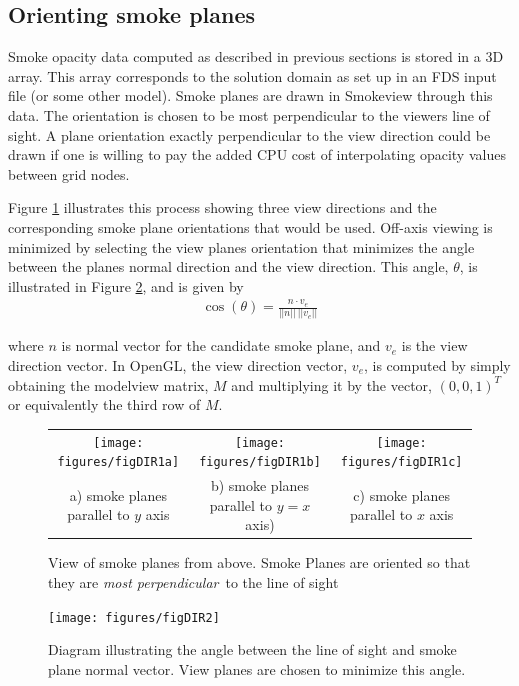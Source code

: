%
%

\subsection{Orienting smoke planes}

Smoke opacity data computed as described in previous sections is
stored in a 3D array. This array corresponds to the solution
domain as set up in an FDS input file (or some other model). Smoke
planes are drawn in Smokeview through this data.  The orientation
is chosen to be most perpendicular to the viewers line of sight. A
plane orientation exactly perpendicular to the view direction
could be drawn if one is willing to pay the added CPU cost of
interpolating opacity values between grid nodes.

Figure \ref{figDIRA} illustrates this process showing three view
directions and the corresponding smoke plane orientations that
would be used. Off-axis viewing is minimized by selecting the view
planes orientation that minimizes the angle between the planes
normal direction and the view direction. This angle, $\theta$, is
illustrated in Figure \ref{figDIRB}, and is given by
\begin{eqnarray*}
\cos(\theta)=\frac{n\cdot v_e}{||n||~||v_e||}
\end{eqnarray*}

\noindent where $n$ is normal vector for the candidate smoke
plane, and $v_e$ is the view direction vector.  In OpenGL, the
view direction vector, $v_e$, is computed by simply obtaining the
modelview matrix, $M$ and multiplying it by the vector,
$(0,0,1)^T$ or equivalently the third row of $M$.

\begin{figure}
\begin{tabular}{ccc}
\texttt{[image: figures/figDIR1a]}&
\texttt{[image: figures/figDIR1b]}&
\texttt{[image: figures/figDIR1c]}\\
a) smoke planes parallel to $y$ axis& b) smoke planes parallel to
$y=x$ axis)&
c) smoke planes parallel to $x$ axis\\
\end{tabular}
\caption{View of smoke planes from above.  Smoke Planes are
oriented so that they are {\em most perpendicular}\ to the line of sight }
\label{figDIRA}
\end{figure}

\begin{figure}
\centerline{\texttt{[image: figures/figDIR2]}}
\caption{Diagram illustrating the angle between the line of sight
and smoke plane normal vector.  View planes are chosen to minimize
this angle.} \label{figDIRB}
\end{figure}

